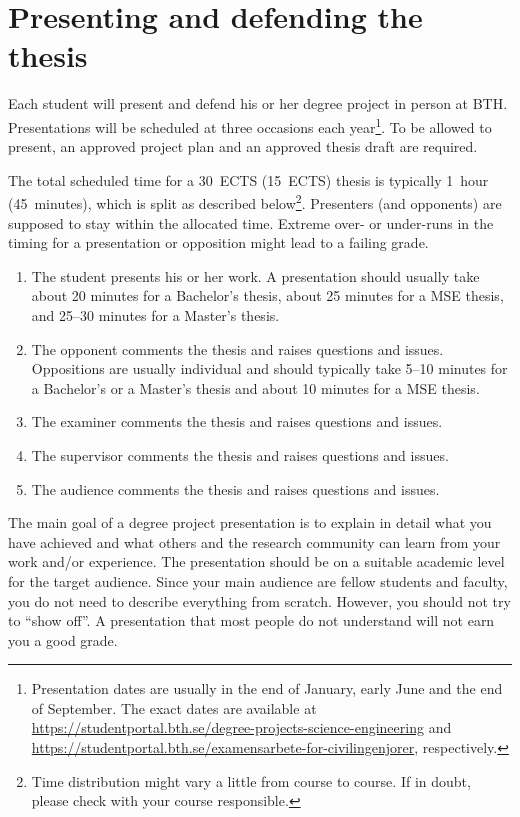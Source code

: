 \documentclass[a4paper,12pt]{book}
\begin{document}


\chapter{Presenting and defending the thesis}
\label{chp:presenting-and-defending}
Each student will present and defend his or her degree project in person at BTH.
Presentations will be scheduled at three occasions each year\footnote{Presentation
dates are usually in the end of January, early June and the end of September.
The exact dates are available at
\url{https://studentportal.bth.se/degree-projects-science-engineering}
and \url{https://studentportal.bth.se/examensarbete-for-civilingenjorer}, respectively.}.
To be allowed to present, an approved project plan and an approved thesis draft are required. 

The total scheduled time for a 30~ECTS (15~ECTS) thesis is typically 1~hour (45~minutes),
which is split as described below\footnote{Time distribution might vary a little
from course to course. If in doubt, please check with your course responsible.}.
Presenters (and opponents) are supposed to stay within the allocated time.
Extreme over- or under-runs in the timing for a presentation or opposition
might lead to a failing grade.
\begin{enumerate}
	\item The student presents his or her work. A presentation should usually take
	      about 20 minutes for a Bachelor's thesis, about 25 minutes for a MSE thesis,
				and 25--30 minutes for a Master's thesis.
	\item The opponent comments the thesis and raises questions and issues.
	      Oppositions are usually individual and should typically take 5--10 minutes
				for a Bachelor's or a Master's thesis and about 10 minutes for a MSE thesis.
	\item The examiner comments the thesis and raises questions and issues.
	\item The supervisor comments the thesis and raises questions and issues.
	\item The audience comments the thesis and raises questions and issues.
\end{enumerate}

The main goal of a degree project presentation is to explain in detail what
you have achieved and what others and the research community can learn from your
work and/or experience. The presentation should be on a suitable academic
level for the target audience. Since your main audience are fellow students and
faculty, you do not need to describe everything from scratch. However, you should not try to ``show off''. A presentation that most people do not
understand will not earn you a good grade. 
\end{document}
